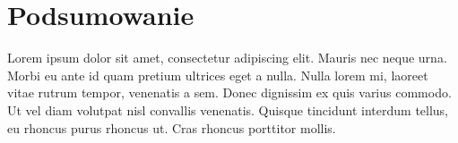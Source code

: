 \documentclass[a4paper,12pt,oneside]{book}
\begin{document}
	\newpage
	\chapter{Podsumowanie}
	Lorem ipsum dolor sit amet, consectetur adipiscing elit. Mauris nec neque urna. Morbi eu ante id quam pretium ultrices eget a nulla. Nulla lorem mi, laoreet vitae rutrum tempor, venenatis a sem. Donec dignissim ex quis varius commodo. Ut vel diam volutpat nisl convallis venenatis. Quisque tincidunt interdum tellus, eu rhoncus purus rhoncus ut. Cras rhoncus porttitor mollis.
	
\end{document}
